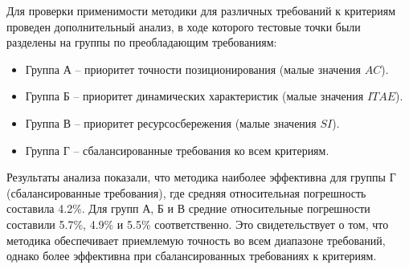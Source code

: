 Для проверки применимости методики для различных требований к критериям проведен
дополнительный анализ, в ходе которого тестовые точки были разделены на группы по преобладающим требованиям:
\begin{itemize}
	\item Группа А -- приоритет точности позиционирования (малые значения $AC$).
	\item Группа Б -- приоритет динамических характеристик (малые значения $ITAE$).
	\item Группа В -- приоритет ресурсосбережения (малые значения $SI$).
	\item Группа Г -- сбалансированные требования ко всем критериям.
\end{itemize}

Результаты анализа показали, что методика наиболее эффективна для группы Г (сбалансированные требования),
где средняя относительная погрешность составила \num{4.2}\%. Для групп А, Б и В средние
относительные погрешности составили \num{5.7}\%, \num{4.9}\% и \num{5.5}\% соответственно.
Это свидетельствует о том, что методика обеспечивает приемлемую точность во всем диапазоне
требований, однако более эффективна при сбалансированных требованиях к критериям.
